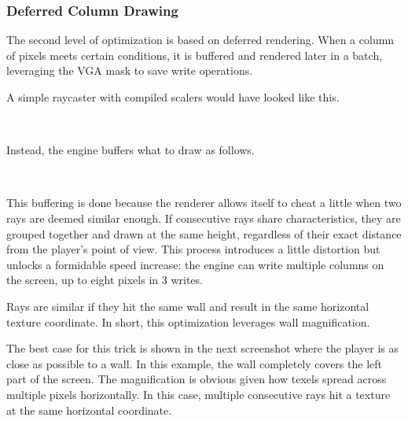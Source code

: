 \subsubsection{Deferred Column Drawing}
The second level of optimization is based on deferred rendering. When a column of pixels meets certain conditions, it is buffered and rendered later in a batch, leveraging the VGA mask to save write operations.\\
\par 
A simple raycaster with compiled scalers would have looked like this.\\

\begin{minipage}{\textwidth}

\end{minipage}\\
\par
Instead, the engine buffers what to draw as follows.\\
\par
\begin{minipage}{\textwidth}

\end{minipage}\\

\par
This buffering is done because the renderer allows itself to cheat a little when two rays are deemed similar enough. If consecutive rays share characteristics, they are grouped together and drawn at the same height, regardless of their exact distance from the player's point of view. This process introduces a little distortion but unlocks a formidable speed increase: the engine can write multiple columns on the screen, up to eight pixels in 3 writes.\\
\par
Rays are similar if they hit the same wall and result in the same  horizontal texture coordinate. In short, this optimization leverages wall magnification.\\
\par
The best case for this trick is shown in the next screenshot where the player is as close as possible to a wall. In this example, the wall completely covers the left part of the screen. The magnification is obvious given how texels spread across multiple pixels horizontally. In this case, multiple consecutive rays hit a texture at the same horizontal coordinate.\\
\par
\par

